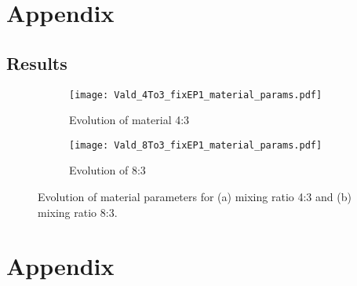 \begin{appendices}
    \chapter{Appendix}
    \section{Results}


    \begin{figure}[H]
    \centering
    \begin{subfigure}[t]{1.0\textwidth}
        \centering
        \texttt{[image: Vald\_4To3\_fixEP1\_material\_params.pdf]}
        \caption{Evolution of material 4:3}
        \label{fig:material_params_4to3}
    \end{subfigure}
    \begin{subfigure}[t]{1.0\textwidth}
        \centering
        \texttt{[image: Vald\_8To3\_fixEP1\_material\_params.pdf]}
        \caption{Evolution of 8:3}
        \label{fig:material_params_8to3}
    \end{subfigure}
    \caption{Evolution of material parameters for (a) mixing ratio 4:3 and (b) mixing ratio 8:3.}
    \label{fig:validation_material_params}
    \end{figure}
    \chapter{Appendix}
\end{appendices}